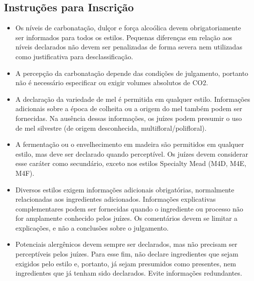 
\subsection*{Instruções para Inscrição}

\begin{itemize}

\item Os níveis de carbonatação, dulçor e força alcoólica devem obrigatoriamente ser informados para todos os estilos. Pequenas diferenças em relação aos níveis declarados não devem ser penalizadas de forma severa nem utilizadas como justificativa para desclassificação.
\item A percepção da carbonatação depende das condições de julgamento, portanto não é necessário especificar ou exigir volumes absolutos de CO2.
\item A declaração da variedade de mel é permitida em qualquer estilo. Informações adicionais sobre a época de colheita ou a origem do mel também podem ser fornecidas. Na ausência dessas informações, os juízes podem presumir o uso de mel silvestre (de origem desconhecida, multifloral/polifloral).
\item A fermentação ou o envelhecimento em madeira são permitidos em qualquer estilo, mas deve ser declarado quando perceptível. Os juízes devem considerar esse caráter como secundário, exceto nos estilos Specialty Mead (M4D, M4E, M4F).
\item Diversos estilos exigem informações adicionais obrigatórias, normalmente relacionadas aos ingredientes adicionados. Informações explicativas complementares podem ser fornecidas quando o ingrediente ou processo não for amplamente conhecido pelos juízes. Os comentários devem se limitar a explicações, e não a conclusões sobre o julgamento.
\item Potenciais alergênicos devem sempre ser declarados, mas não precisam ser perceptíveis pelos juízes. Para esse fim, não declare ingredientes que sejam exigidos pelo estilo e, portanto, já sejam presumidos como presentes, nem ingredientes que já tenham sido declarados. Evite informações redundantes.

\end{itemize}
